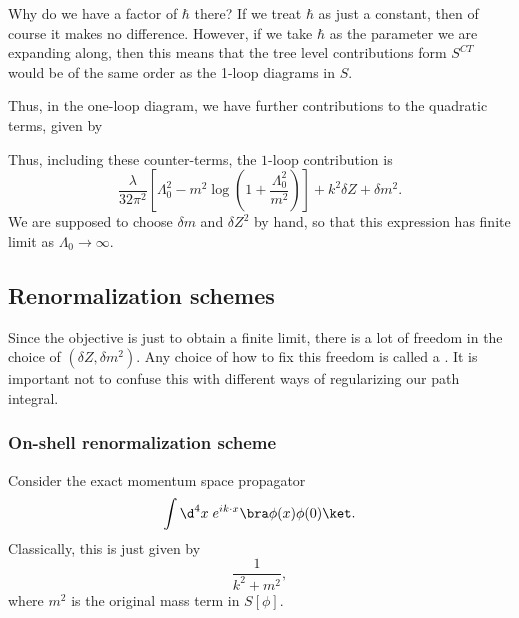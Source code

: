\documentclass[a4paper]{article}
\begin{document}
Why do we have a factor of $\hbar$ there? If we treat $\hbar$ as just a constant, then of course it makes no difference. However, if we take $\hbar$ as the parameter we are expanding along, then this means that the tree level contributions form $S^{CT}$ would be of the same order as the 1-loop diagrams in $S$.

Thus, in the one-loop diagram, we have further contributions to the quadratic terms, given by
\begin{center}
  \quad\quad
\end{center}
Thus, including these counter-terms, the $1$-loop contribution is
\[
  \frac{\lambda}{32 \pi^2} \left[\Lambda_0^2 - m^2 \log \left(1 + \frac{\Lambda_0^2}{m^2}\right)\right] + k^2 \delta Z + \delta m^2.
\]
We are supposed to choose $\delta m$ and $\delta Z^2$ by hand, so that this expression has finite limit as $\Lambda_0 \to \infty$.

\subsection{Renormalization schemes}
Since the objective is just to obtain a finite limit, there is a lot of freedom in the choice of $(\delta Z, \delta m^2)$. Any choice of how to fix this freedom is called a . It is important not to confuse this with different ways of regularizing our path integral.

\subsubsection*{On-shell renormalization scheme}
Consider the exact momentum space propagator
\[
  \int \d^4 x\; e^{ik\cdot x} \bra \phi(x) \phi(0)\ket.
\]
Classically, this is just given by
\[
  \frac{1}{k^2 + m^2},
\]
where $m^2$ is the original mass term in $S[\phi]$.
\end{document}
